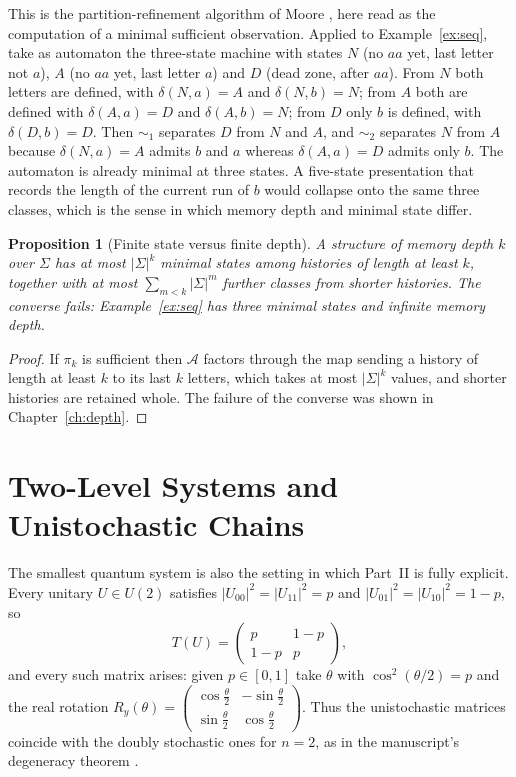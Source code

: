 \documentclass[11pt,oneside]{book}
\newtheorem{proposition}[theorem]{Proposition}
\theoremstyle{definition}
\theoremstyle{remark}
\newcommand{\Adm}{\mathcal{A}}
\begin{document}
This is the partition-refinement algorithm of Moore \cite{moore1956}, here read as the computation of a minimal sufficient observation. Applied to Example~\ref{ex:seq}, take as automaton the three-state machine with states $N$ (no $aa$ yet, last letter not $a$), $A$ (no $aa$ yet, last letter $a$) and $D$ (dead zone, after $aa$). From $N$ both letters are defined, with $\delta(N,a)=A$ and $\delta(N,b)=N$; from $A$ both are defined with $\delta(A,a)=D$ and $\delta(A,b)=N$; from $D$ only $b$ is defined, with $\delta(D,b)=D$. Then $\sim_1$ separates $D$ from $N$ and $A$, and $\sim_2$ separates $N$ from $A$ because $\delta(N,a)=A$ admits $b$ and $a$ whereas $\delta(A,a)=D$ admits only $b$. The automaton is already minimal at three states. A five-state presentation that records the length of the current run of $b$ would collapse onto the same three classes, which is the sense in which memory depth and minimal state differ.

\begin{proposition}[Finite state versus finite depth]\label{prop:finite-state}
A structure of memory depth $k$ over $\Sigma$ has at most $|\Sigma|^k$ minimal states among histories of length at least $k$, together with at most $\sum_{m<k}|\Sigma|^m$ further classes from shorter histories. The converse fails: Example~\ref{ex:seq} has three minimal states and infinite memory depth.
\end{proposition}

\begin{proof}
If $\pi_k$ is sufficient then $\Adm$ factors through the map sending a history of length at least $k$ to its last $k$ letters, which takes at most $|\Sigma|^k$ values, and shorter histories are retained whole. The failure of the converse was shown in Chapter~\ref{ch:depth}.
\end{proof}

\chapter{Two-Level Systems and Unistochastic Chains}\label{ch:qubit}

The smallest quantum system is also the setting in which Part~II is fully explicit. Every unitary $U\in U(2)$ satisfies $|U_{00}|^2=|U_{11}|^2=p$ and $|U_{01}|^2=|U_{10}|^2=1-p$, so
\[
T(U)=\begin{pmatrix}p&1-p\\1-p&p\end{pmatrix},
\]
and every such matrix arises: given $p\in[0,1]$ take $\theta$ with $\cos^2(\theta/2)=p$ and the real rotation $R_y(\theta)=\begin{pmatrix}\cos\frac\theta2&-\sin\frac\theta2\\ \sin\frac\theta2&\cos\frac\theta2\end{pmatrix}$. Thus the unistochastic matrices coincide with the doubly stochastic ones for $n=2$, as in the manuscript's degeneracy theorem \cite{flyxion2026uqm}.
\end{document}
